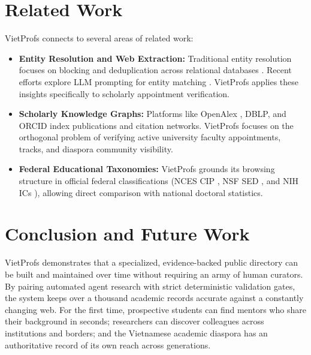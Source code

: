 \documentclass[11pt]{article}
\begin{document}
\section{Related Work}
\label{sec:related}
VietProfs connects to several areas of related work:
\begin{itemize}
\item \textbf{Entity Resolution and Web Extraction:} Traditional entity resolution focuses on blocking and deduplication across relational databases \cite{christophides2019er,elmagarmid2007duplicate}. Recent efforts explore LLM prompting for entity matching \cite{peeters2023llm,li2024er}. VietProfs applies these insights specifically to scholarly appointment verification.
\item \textbf{Scholarly Knowledge Graphs:} Platforms like OpenAlex \cite{priem2022openalex}, DBLP, and ORCID index publications and citation networks. VietProfs focuses on the orthogonal problem of verifying active university faculty appointments, tracks, and diaspora community visibility.
\item \textbf{Federal Educational Taxonomies:} VietProfs grounds its browsing structure in official federal classifications (NCES CIP \cite{nces_cip2020}, NSF SED \cite{nsf_sed}, and NIH ICs \cite{nih_ics}), allowing direct comparison with national doctoral statistics.
\end{itemize}

\section{Conclusion and Future Work}
\label{sec:conclusion}
VietProfs demonstrates that a specialized, evidence-backed public directory can be built and maintained over time without requiring an army of human curators.
By pairing automated agent research with strict deterministic validation gates, the system keeps over a thousand academic records accurate against a constantly changing web.
For the first time, prospective students can find mentors who share their background in seconds; researchers can discover colleagues across institutions and borders; and the Vietnamese academic diaspora has an authoritative record of its own reach across generations.
\end{document}
